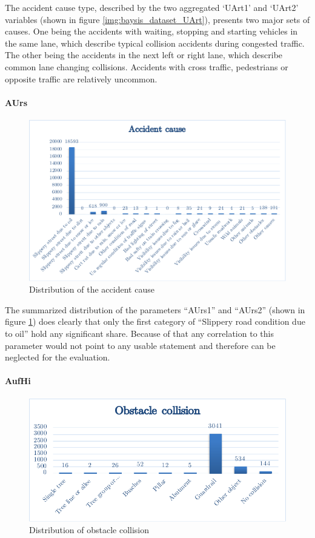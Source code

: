 \documentclass[a4paper,12pt]{report}
\begin{document}
The accident cause type, described by the two aggregated ‘UArt1’ and ‘UArt2’ variables (shown in figure \ref{img:baysis_dataset_UArt}), presents two major sets of causes. One being the accidents with waiting, stopping and starting vehicles in the same lane, which describe typical collision accidents during congested traffic. The other being the accidents in the next left or right lane, which describe common lane changing collisions. Accidents with cross traffic, pedestrians or opposite traffic are relatively uncommon.

\paragraph{AUrs}
\begin{figure}[h]
	\centering
	\includegraphics[scale=0.7]{./assets/baysis_dataset_AUrs.pdf}
	\caption{Distribution of the accident cause}
	\label{img:baysis_dataset_AUrs}
\end{figure}

The summarized distribution of the parameters “AUrs1” and “AUrs2” (shown in figure \ref{img:baysis_dataset_AUrs}) does clearly that only the first category of “Slippery road condition due to oil” hold any significant share. Because of that any correlation to this parameter would not point to any usable statement and therefore can be neglected for the evaluation.

\paragraph{AufHi}
\begin{figure}[]
	\centering
	\includegraphics[scale=0.6]{./assets/baysis_dataset_Aufhi.pdf}
	\caption{Distribution of obstacle collision}
	\label{img:baysis_dataset_Aufhi}
\end{figure}
\end{document}

